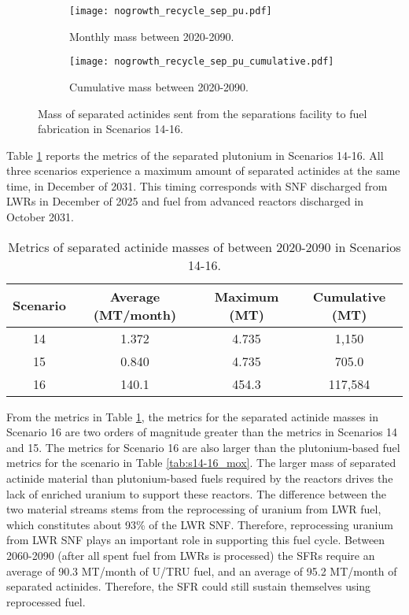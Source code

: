 \begin{figure}[h!]
    \centering
    \begin{subfigure}[b]{0.49\textwidth}
        \centering
        \texttt{[image: nogrowth\_recycle\_sep\_pu.pdf]}
        \caption{Monthly mass between 2020-2090.}
        \label{fig:nogrowth_recycle_sep_pu_all}
    \end{subfigure}
    \hfill
    \begin{subfigure}[b]{0.49\textwidth}
        \centering
        \texttt{[image: nogrowth\_recycle\_sep\_pu\_cumulative.pdf]}
        \caption{Cumulative mass between 2020-2090.}
        \label{fig:nogrowth_recycle_sep_pu_cumulative}
    \end{subfigure}
       \caption{Mass of separated actinides sent from the 
       separations facility to fuel fabrication in Scenarios 14-16.}
       \label{fig:nogrowth_recycle_sep_pu}
\end{figure}

Table \ref{tab:s14-16_sep_pu} reports the metrics of the separated 
plutonium in Scenarios 14-16. All three scenarios experience a 
maximum amount of separated actinides at the same time, in 
December of 2031. This timing corresponds with \gls{SNF} discharged 
from \glspl{LWR} in December of 2025 and fuel from advanced reactors
discharged in October 2031. 

\begin{table}[h!]
    \centering 
    \caption{Metrics of separated actinide masses of between 2020-2090 in 
    Scenarios 14-16.}
    \label{tab:s14-16_sep_pu}
    \begin{tabular}{c c c c}
        \hline 
        Scenario & Average (MT/month) & Maximum (MT) & Cumulative (MT) \\
        \hline
        14 & 1.372 & 4.735 & 1,150\\
        15 & 0.840 & 4.735 & 705.0\\
        16 & 140.1 & 454.3 & 117,584\\
        \hline
    \end{tabular}
\end{table}

From the metrics in Table \ref{tab:s14-16_sep_pu}, the metrics for 
the separated actinide masses in Scenario 16 are two orders of 
magnitude greater than the metrics in Scenarios 14 and 15. The metrics 
for Scenario 16 are also larger than the plutonium-based fuel metrics 
for the scenario in Table \ref{tab:s14-16_mox}. The larger mass 
of separated actinide material than plutonium-based fuels required by 
the reactors drives the lack of enriched uranium to support these 
reactors. The difference between the two material streams stems 
from the reprocessing of uranium from \gls{LWR} fuel, which constitutes 
about 93\% of the \gls{LWR} \gls{SNF}. Therefore, reprocessing 
uranium from \gls{LWR} \gls{SNF} plays an important role in supporting 
this fuel cycle. Between 2060-2090 (after all spent fuel from 
\glspl{LWR} is processed) the \glspl{SFR} require an 
average of 90.3 MT/month of U/TRU fuel, and an average of 95.2 
MT/month of separated actinides. Therefore, the \gls{SFR} could 
still sustain themselves using reprocessed fuel.

